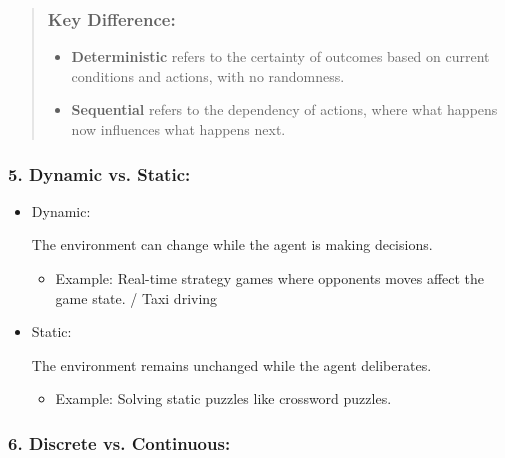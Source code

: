 \documentclass[
]{article}
\begin{document}
\begin{itemize}
\begin{quote}
  \subsubsection{\texorpdfstring{\textbf{Key
  Difference}:}{Key Difference:}}\label{key-difference}

  \begin{itemize}
  \item
    \textbf{Deterministic} refers to the certainty of outcomes based on
    current conditions and actions, with no randomness.
  \item
    \textbf{Sequential} refers to the dependency of actions, where what
    happens now influences what happens next.
  \end{itemize}
  \end{quote}
\end{itemize}

\subsubsection{\texorpdfstring{\textbf{5. Dynamic vs.
Static:}}{5. Dynamic vs. Static:}}\label{5-dynamic-vs-static}

\begin{itemize}
\item
  Dynamic:

  The environment can change while the agent is making decisions.

  \begin{itemize}
  \item
    Example: Real-time strategy games where opponents\textquotesingle{}
    moves affect the game state. / Taxi driving
  \end{itemize}
\item
  Static:

  The environment remains unchanged while the agent deliberates.

  \begin{itemize}
  \item
    Example: Solving static puzzles like crossword puzzles.
  \end{itemize}
\end{itemize}

\subsubsection{\texorpdfstring{\textbf{6. Discrete vs.
Continuous:}}{6. Discrete vs. Continuous:}}\label{6-discrete-vs-continuous}
\end{document}
